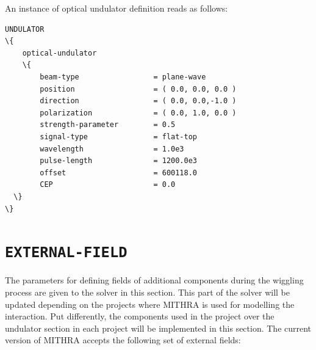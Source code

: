 %
An instance of optical undulator definition reads as follows:
%
\begin{snugshade}
\begin{Verbatim}[fontsize=\small, tabsize=4, fontfamily=courier, fontseries=b, commandchars=\\\{\}, obeytabs]
UNDULATOR
\{
	optical-undulator
	\{
		beam-type				  = plane-wave
		position				  = ( 0.0, 0.0, 0.0 )
		direction				  = ( 0.0, 0.0,-1.0 )
		polarization			  = ( 0.0, 1.0, 0.0 )
		strength-parameter		  = 0.5
		signal-type				  = flat-top
		wavelength				  = 1.0e3
		pulse-length			  = 1200.0e3
		offset					  = 600118.0
		CEP						  = 0.0
  \}
\}
\end{Verbatim}
\end{snugshade}

\section{\texttt{EXTERNAL-FIELD}}

The parameters for defining fields of additional components during the wiggling process are given to the solver in this section.
%
This part of the solver will be updated depending on the projects where MITHRA is used for modelling the interaction.
%
Put differently, the components used in the project over the undulator section in each project will be implemented in this section.
%
The current version of MITHRA accepts the following set of external fields:

